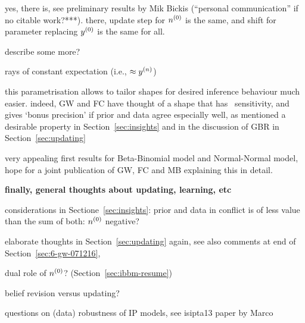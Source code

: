 yes, there is, see preliminary results by Mik Bickis (``personal communication'' if no citable work?***).
there, update step for $n^{(0)}$ is the same, and shift for parameter replacing $y^{(0)}$ is the same for all. 

describe some more?

rays of constant expectation (i.e., $\approx y^{(n)}$)

this parametrisation allows to tailor shapes for desired inference behaviour much easier.
indeed, GW and FC have thought of a shape that has \pdc\ sensitivity,
and gives `bonus precision' if prior and data agree especially well,
as mentioned a desirable property in Section~\ref{sec:insights}
and in the discussion of GBR in Section~\ref{sec:updating}

very appealing first results for Beta-Binomial model and Normal-Normal model,
hope for a joint publication of GW, FC and MB explaining this in detail.


\textbf{finally, general thoughts about updating, learning, etc}

considerations in Sectione~\ref{sec:insights}:
prior and data in conflict is of less value than the sum of both:
$n^{(0)}$ negative?


elaborate thoughts in Section~\ref{sec:updating} again,
see also comments at end of Section~\ref{sec:6-gw-071216},

dual role of $n^{(0)}$? (Section~\ref{sec:ibbm-resume})

belief revision versus updating?

questions on (data) robustness of IP models, see isipta13 paper by Marco



